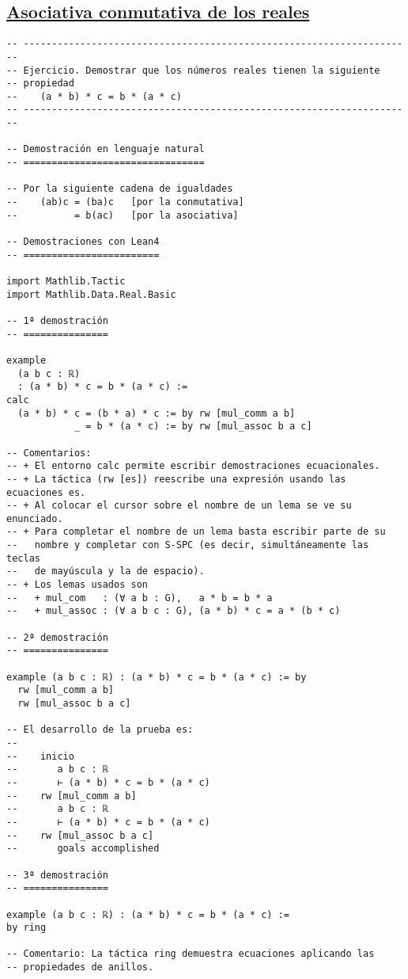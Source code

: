 \subsection{\href{./src/Basicos/Asociativa\_conmutativa\_de\_los\_reales.lean}{Asociativa conmutativa de los reales}}
\label{sec:org6a0d15c}
\begin{verbatim}
-- ---------------------------------------------------------------------
-- Ejercicio. Demostrar que los números reales tienen la siguiente
-- propiedad
--    (a * b) * c = b * (a * c)
-- ---------------------------------------------------------------------

-- Demostración en lenguaje natural
-- ================================

-- Por la siguiente cadena de igualdades
--    (ab)c = (ba)c   [por la conmutativa]
--          = b(ac)   [por la asociativa]

-- Demostraciones con Lean4
-- ========================

import Mathlib.Tactic
import Mathlib.Data.Real.Basic

-- 1ª demostración
-- ===============

example
  (a b c : ℝ)
  : (a * b) * c = b * (a * c) :=
calc
  (a * b) * c = (b * a) * c := by rw [mul_comm a b]
            _ = b * (a * c) := by rw [mul_assoc b a c]

-- Comentarios:
-- + El entorno calc permite escribir demostraciones ecuacionales.
-- + La táctica (rw [es]) reescribe una expresión usando las ecuaciones es.
-- + Al colocar el cursor sobre el nombre de un lema se ve su enunciado.
-- + Para completar el nombre de un lema basta escribir parte de su
--   nombre y completar con S-SPC (es decir, simultáneamente las teclas
--   de mayúscula y la de espacio).
-- + Los lemas usados son
--   + mul_com   : (∀ a b : G),   a * b = b * a
--   + mul_assoc : (∀ a b c : G), (a * b) * c = a * (b * c)

-- 2ª demostración
-- ===============

example (a b c : ℝ) : (a * b) * c = b * (a * c) := by
  rw [mul_comm a b]
  rw [mul_assoc b a c]

-- El desarrollo de la prueba es:
--
--    inicio
--       a b c : ℝ
--       ⊢ (a * b) * c = b * (a * c)
--    rw [mul_comm a b]
--       a b c : ℝ
--       ⊢ (a * b) * c = b * (a * c)
--    rw [mul_assoc b a c]
--       goals accomplished

-- 3ª demostración
-- ===============

example (a b c : ℝ) : (a * b) * c = b * (a * c) :=
by ring

-- Comentario: La táctica ring demuestra ecuaciones aplicando las
-- propiedades de anillos.
\end{verbatim}

